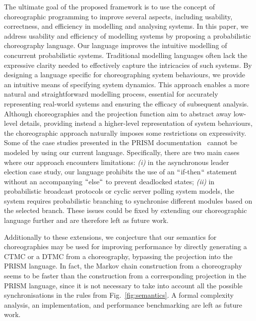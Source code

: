 The ultimate goal of the proposed framework is to use the concept of
choreographic programming to improve several aspects, including
usability, correctness, and efficiency in modelling and analysing
systems.
In this paper, we address usability and efficiency of modelling
systems by proposing a probabilistic choreography language.
Our language improves the intuitive modelling of concurrent
probabilistic systems. Traditional modelling languages often lack the
expressive clarity needed to effectively capture the intricacies of
such systems. By designing a language specific for choreographing
system behaviours, we provide an intuitive means of specifying system
dynamics. This approach enables a more natural and straightforward
modelling process, essential for accurately representing real-world
systems and ensuring the efficacy of subsequent analysis.
Although choreographies and the projection function aim to abstract
away low-level details, providing instead a higher-level
representation of system behaviours, the choreographic approach
naturally imposes some restrictions on expressivity.    Some of the case studies presented in the
PRISM documentation~\cite{PRISMdoc} cannot be modeled by using our
current language. Specifically, there are two main cases where our
approach encounters limitations:
\textit{(i)} in the asynchronous leader election case study, our
language prohibits the use of an $\lq\lq$if-then$\lq\lq$ statement without an
accompanying $\lq\lq$else$\lq\lq$ to prevent deadlocked states;
\textit{(ii)} in probabilistic broadcast protocols or cyclic server
polling system models, the system requires probabilistic branching to
synchronise different modules based on the selected branch.
These issues could be fixed by extending our choreographic language
further and are therefore left as future work.

Additionally to these extensions, we conjecture that our semantics for
choreographies may be used for improving performance by directly
generating a CTMC or a DTMC from a choreography, bypassing the
projection into the PRISM language. In fact, the Markov chain
construction from a choreography seems to be faster than the
construction from a corresponding projection in the PRISM language,
since it is not necessary to take into account all the possible
synchronisations in the rules from Fig.~\ref{fig:semantics}. A formal
complexity analysis, an implementation, and performance benchmarking
are left as future work.



